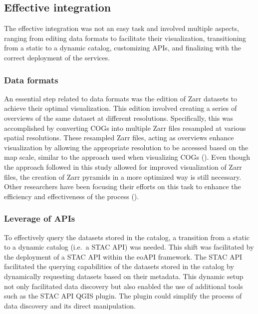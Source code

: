 \documentclass[
  oneside,
  open=any]{scrbook}
\begin{document}
\subsection{Effective integration}\label{effective-integration}

The effective integration was not an easy task and involved multiple
aspects, ranging from editing data formats to facilitate their
visualization, transitioning from a static to a dynamic catalog,
customizing APIs, and finalizing with the correct deployment of the
services.

\subsubsection*{Data formats}\label{data-formats}

An essential step related to data formats was the edition of Zarr
datasets to achieve their optimal visualization. This edition involved
creating a series of overviews of the same dataset at different
resolutions. Specifically, this was accomplished by converting COGs into
multiple Zarr files resampled at various spatial resolutions. These
resampled Zarr files, acting as overviews enhance visualization by
allowing the appropriate resolution to be accessed based on the map
scale, similar to the approach used when visualizing COGs
(). Even though the
approach followed in this study allowed for improved visualization of
Zarr files, the creation of Zarr pyramids in a more optimized way is
still necessary. Other researchers have been focusing their efforts on
this task to enhance the efficiency and effectiveness of the process
().

\subsubsection*{Leverage of APIs}\label{leverage-of-apis}

To effectively query the datasets stored in the catalog, a transition
from a static to a dynamic catalog (i.e.~a STAC API) was needed. This
shift was facilitated by the deployment of a STAC API within the eoAPI
framework. The STAC API facilitated the querying capabilities of the
datasets stored in the catalog by dynamically requesting datasets based
on their metadata. This dynamic setup not only facilitated data
discovery but also enabled the use of additional tools such as the STAC
API QGIS plugin. The plugin could simplify the process of data discovery
and its direct manipulation.
\end{document}

